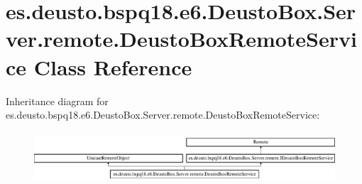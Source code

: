 \hypertarget{classes_1_1deusto_1_1bspq18_1_1e6_1_1_deusto_box_1_1_server_1_1remote_1_1_deusto_box_remote_service}{}\section{es.\+deusto.\+bspq18.\+e6.\+Deusto\+Box.\+Server.\+remote.\+Deusto\+Box\+Remote\+Service Class Reference}
\label{classes_1_1deusto_1_1bspq18_1_1e6_1_1_deusto_box_1_1_server_1_1remote_1_1_deusto_box_remote_service}
Inheritance diagram for es.\+deusto.\+bspq18.\+e6.\+Deusto\+Box.\+Server.\+remote.\+Deusto\+Box\+Remote\+Service\+:\begin{figure}[H]
\begin{center}
\leavevmode
\includegraphics[height=1.922197cm]{classes_1_1deusto_1_1bspq18_1_1e6_1_1_deusto_box_1_1_server_1_1remote_1_1_deusto_box_remote_service}
\end{center}
\end{figure}

